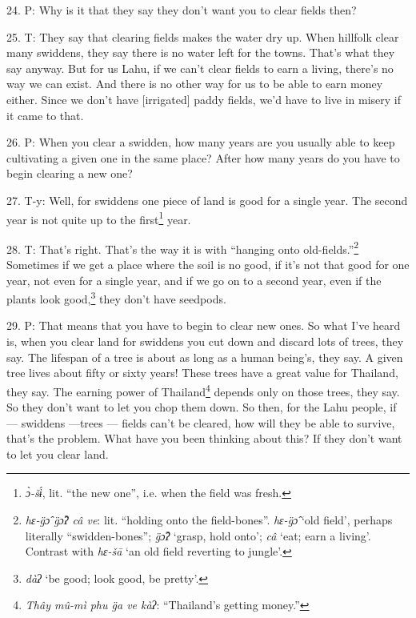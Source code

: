 24. P: Why is it that they say they don't want you to clear fields then?

25. T: They say that clearing fields makes the water dry up. When hillfolk clear
many swiddens, they say there is no water left for the towns. That's what they
say anyway. But for us Lahu, if we can't clear fields to earn a living, there's
no way we can exist. And there is no other way for us to be able to earn money
either. Since we don't have [irrigated] paddy fields, we'd have to live in misery
if it came to that.

26. P: When you clear a swidden, how many years are you usually able to keep cultivating
a given one in the same place? After how many years do you have to begin clearing
a new one?

27. T-y: Well, for swiddens one piece of land is good for a single year. The second
year is not quite up to the first\footnote{\textit{ɔ̀-šɨ́}, lit. ``the new one'', i.e. when the field was fresh.} year.

28. T: That's right. That's the way it is with ``hanging onto old-fields.''\footnote{\textit{hɛ-g̈ɔ̂ g̈ɔ̂ʔ câ ve}: lit. ``holding onto the field-bones''. \textit{hɛ-g̈ɔ̂} `old field', perhaps literally ``swidden-bones''; \textit{g̈ɔ̂ʔ} `grasp, hold onto'; \textit{câ} `eat; earn a living'. Contrast with \textit{hɛ-šā }`an old field reverting to jungle'.}
Sometimes if we get a place where the soil is no good, if it's not that good for
one year, not even for a single year, and if we go on to a second year, even if
the plants look good,\footnote{\textit{dàʔ} `be good; look good, be pretty'.} they don't have seedpods.

29. P: That means that you have to begin to clear new ones. So what I've heard
is, when you clear land for swiddens you cut down and discard lots of trees, they
say. The lifespan of a tree is about as long as a human being's, they say. A given
tree lives about fifty or sixty years! These trees have a great value for Thailand,
they say. The earning power of Thailand\footnote{\textit{Thây mû-mì phu g̈a ve kàʔ}: ``Thailand's getting money.''} depends only on those trees, they say.
So they don't want to let you chop them down. So then, for the Lahu people, if
--- swiddens ---trees --- fields can't be cleared, how will they be able to survive,
that's the problem. What have you been thinking about this? If they don't want
to let you clear land.

